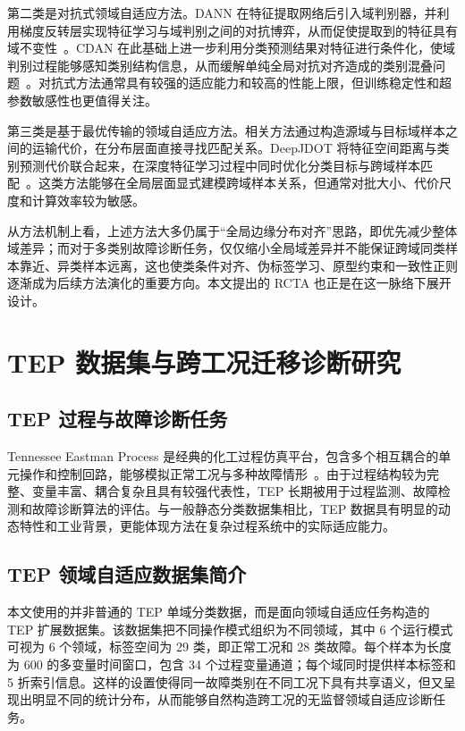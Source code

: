 第二类是对抗式领域自适应方法。DANN 在特征提取网络后引入域判别器，并利用梯度反转层实现特征学习与域判别之间的对抗博弈，从而促使提取到的特征具有域不变性~\cite{ganin2016dann}。CDAN 在此基础上进一步利用分类预测结果对特征进行条件化，使域判别过程能够感知类别结构信息，从而缓解单纯全局对抗对齐造成的类别混叠问题~\cite{long2018conditional}。对抗式方法通常具有较强的适应能力和较高的性能上限，但训练稳定性和超参数敏感性也更值得关注。

第三类是基于最优传输的领域自适应方法。相关方法通过构造源域与目标域样本之间的运输代价，在分布层面直接寻找匹配关系。DeepJDOT 将特征空间距离与类别预测代价联合起来，在深度特征学习过程中同时优化分类目标与跨域样本匹配~\cite{damodaran2018deepjdot}。这类方法能够在全局层面显式建模跨域样本关系，但通常对批大小、代价尺度和计算效率较为敏感。

从方法机制上看，上述方法大多仍属于“全局边缘分布对齐”思路，即优先减少整体域差异；而对于多类别故障诊断任务，仅仅缩小全局域差异并不能保证跨域同类样本靠近、异类样本远离，这也使类条件对齐、伪标签学习、原型约束和一致性正则逐渐成为后续方法演化的重要方向。本文提出的 RCTA 也正是在这一脉络下展开设计。

\section{TEP 数据集与跨工况迁移诊断研究}
\subsection{TEP 过程与故障诊断任务}
Tennessee Eastman Process 是经典的化工过程仿真平台，包含多个相互耦合的单元操作和控制回路，能够模拟正常工况与多种故障情形~\cite{downs1993plant}。由于过程结构较为完整、变量丰富、耦合复杂且具有较强代表性，TEP 长期被用于过程监测、故障检测和故障诊断算法的评估。与一般静态分类数据集相比，TEP 数据具有明显的动态特性和工业背景，更能体现方法在复杂过程系统中的实际适应能力。

\subsection{TEP 领域自适应数据集简介}
本文使用的并非普通的 TEP 单域分类数据，而是面向领域自适应任务构造的 TEP 扩展数据集。该数据集把不同操作模式组织为不同领域，其中 6 个运行模式可视为 6 个领域，标签空间为 29 类，即正常工况和 28 类故障。每个样本为长度为 600 的多变量时间窗口，包含 34 个过程变量通道；每个域同时提供样本标签和 5 折索引信息。这样的设置使得同一故障类别在不同工况下具有共享语义，但又呈现出明显不同的统计分布，从而能够自然构造跨工况的无监督领域自适应诊断任务。

